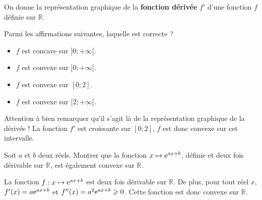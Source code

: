 \documentclass[11pt,fleqn, openany]{book} %
\begin{document}
\begin{exercise}[topic=cvx02]On donne la représentation graphique de la \textbf{fonction dérivée} $f'$ d'une fonction $f$ définie sur $\mathbb{R}$. 

\begin{minipage}{0.6\linewidth}
Parmi les affirmations suivantes, laquelle est correcte ?
\begin{itemize}
\item $f$ est concave sur $]0;+\infty[$.
\item $f$ est convexe sur $]0;+\infty[$.
\item $f$ est convexe sur $[0;2]$.
\item $f$ est convexe sur $[2;+\infty[$.
\end{itemize}
\end{minipage}\hfill\begin{minipage}{0.35\linewidth}
\begin{center}
\end{center}
\end{minipage}
\end{exercise}

\begin{solution}Attention à bien remarquer qu'il s'agit là de la représentation graphique de la dérivée ! La fonction $f'$ est croissante sur $[0;2]$, $f$ est donc convexe sur cet intervalle.\end{solution}




\begin{exercise}[topic=cvx02]Soit $a$ et $b$ deux réels. Montrer que la fonction $x\mapsto \mathrm{e}^{ax+b}$, définie et deux fois dérivable sur $\mathbb{R}$,  est également convexe sur $\mathbb{R}$.\end{exercise}

\begin{solution}La fonction  \(f:x\mapsto \mathrm{e}^{ax+b}\) est deux fois dérivable sur \(\mathbb{R}\). De plus, pour tout réel \(x\), \(f'(x)=a\mathrm{e}^{ax+b}\) et \(f^{\prime\prime}(x)=a^2\mathrm{e}^{ax+b}\geqslant 0\). Cette fonction est donc convexe sur \(\mathbb{R}\).\end{solution}
\end{document}
